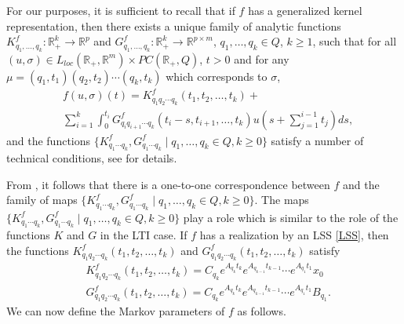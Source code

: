 \documentclass[journal]{IEEEtran}
\begin{document}
For our purposes, it is sufficient to recall that if $f$ has a generalized kernel representation, then there exists a unique family of analytic functions $K^f_{q_1,\ldots,q_k}:\mathbb{R}_{+}^k \rightarrow \mathbb{R}^p$ and $G^f_{q_1,\ldots,q_k}:\mathbb{R}_{+}^k \rightarrow \mathbb{R}^{p \times m}$, $q_1,\ldots,q_k \in Q$, $k \ge 1$, such that for all $(u,\sigma) \in L_{loc}(\mathbb{R}_{+},\mathbb{R}^{m}) \times PC(\mathbb{R}_+,Q)$, $t > 0$ and for any $\mu=(q_1,t_1)(q_2,t_2)\cdots(q_k,t_k)$ which corresponds to $\sigma$,
\begin{equation} \label{eq:inputoutput}
	\begin{aligned}
		& f(u,\sigma)(t)= K^f_{q_1q_2 \cdots q_k}(t_1,t_2, \dots, t_k)+ \\ 
		& \sum_{i=1}^{k} \int_{0}^{t_i}G^f_{q_iq_{i+1} \cdots q_k}(t_i-s,t_{i+1}, \dots, t_k)u \left( s+ \sum_{j=1}^{i-1}t_j \right)ds,
	\end{aligned}
\end{equation}
and the functions $\{K^f_{q_1\cdots q_k}, G^f_{q_1\cdots q_k} \mid q_1,\ldots,q_k \in Q, k \ge 0\}$ satisfy a number of technical conditions, see \cite[Definition 19]{MP:BigArticlePartI} for details.

From \cite{MP:BigArticlePartI}, it follows that there is a one-to-one correspondence between $f$ and the family of maps $\{K^f_{q_1\cdots q_k}, G^f_{q_1\cdots q_k} \mid q_1,\ldots,q_k \in Q, k \ge 0\}$. The maps $\{K^f_{q_1\cdots q_k}, G^f_{q_1\cdots q_k} \mid q_1,\ldots,q_k \in Q, k \ge 0\}$ play a role which is similar to the role of the functions $K$ and $G$ in the LTI case. If $f$ has a realization by an LSS \eqref{LSS}, then the functions $K^f_{q_1q_2 \cdots q_k}(t_1,t_2, \dots, t_k)$ and $G^f_{q_1q_2 \cdots q_k}(t_1,t_2, \dots, t_k)$ satisfy
\begin{align*}
	& K^f_{q_1q_2 \cdots q_k}(t_1,t_2, \dots, t_k)= C_{q_k}e^{A_{q_k}t_k}e^{A_{q_{k-1}}t_{k-1}} \cdots e^{A_{q_1}t_1}x_0 \\
	& G^f_{q_1q_2 \cdots q_k}(t_1,t_2, \dots, t_k)= C_{q_k}e^{A_{q_k}t_k}e^{A_{q_{k-1}}t_{k-1}} \cdots e^{A_{q_1}t_1}B_{q_1}.
\end{align*}
We can now define the Markov parameters of $f$ as follows.
\end{document}
